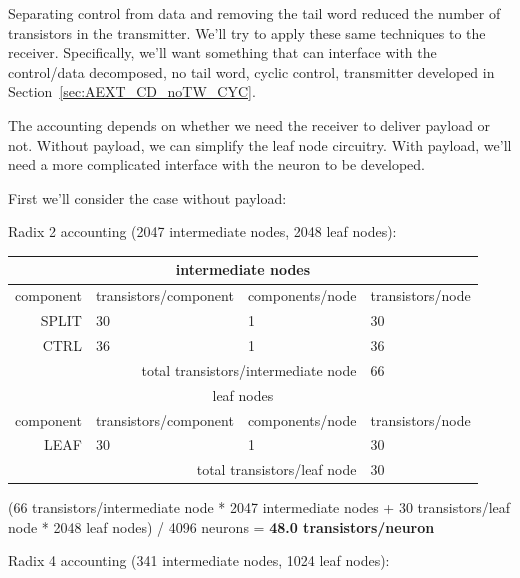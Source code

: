 \documentclass{article}
\begin{document}
Separating control from data and removing the tail word reduced the number of transistors in the transmitter.
We'll try to apply these same techniques to the receiver. Specifically, we'll want something that can interface with the
control/data decomposed, no tail word, cyclic control, transmitter developed in Section~\ref{sec:AEXT_CD_noTW_CYC}.

The accounting depends on whether we need the receiver to deliver payload or not.
Without payload, we can simplify the leaf node circuitry.
With payload, we'll need a more complicated interface with the neuron to be developed.

First we'll consider the case without payload:

\noindent
Radix 2 accounting (2047 intermediate nodes, 2048 leaf nodes):

\begin{center}
    \begin{tabular}{|r|l|l|l|}
    \hline \multicolumn{4}{|c|}{intermediate nodes} \\ \hline
    component & transistors/component & components/node & transistors/node \\ \hline
    SPLIT & 30 & 1 & 30 \\ \hline
    CTRL & 36 & 1 & 36 \\ \hline
    \hline \multicolumn{3}{|r|}{total transistors/intermediate node} & 66 \\ \hline
    \hline \multicolumn{4}{|c|}{leaf nodes} \\ \hline
    component & transistors/component & components/node & transistors/node \\ \hline
    LEAF & 30 & 1 & 30 \\ \hline
    \hline \multicolumn{3}{|r|}{total transistors/leaf node} & 30 \\ \hline
    \end{tabular}
\end{center}

(66 transistors/intermediate node * 2047 intermediate nodes + 30 transistors/leaf node * 2048 leaf nodes) / 4096 neurons = \textbf{48.0 transistors/neuron}

\noindent
Radix 4 accounting (341 intermediate nodes, 1024 leaf nodes):
\end{document}
